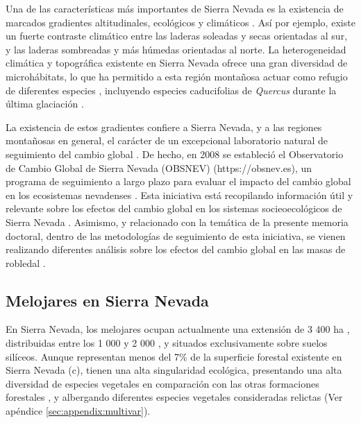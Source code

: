 Una de las características más importantes de Sierra Nevada es la existencia de marcados gradientes altitudinales, ecológicos y climáticos \autocite{Zamoraetal2021UniendoMacro}. Así por ejemplo, existe un fuerte contraste climático entre las laderas soleadas y secas orientadas al sur, y las laderas sombreadas y más húmedas orientadas al norte. La heterogeneidad climática y topográfica existente en Sierra Nevada ofrece una gran diversidad de microhábitats, lo que ha permitido a esta región montañosa actuar como refugio de diferentes especies \autocites{MedailDiadema2009GlacialRefugia,GomezLunt2007RefugiaRefugia,BlancoPastoretal2019TopographyExplains}, incluyendo especies caducifolias de \emph{Quercus} durante la última glaciación \autocites{Olaldeetal2002WhiteOaks,RodriguezSanchezetal2010TreeRange,Petitetal2002IdentificationRefugia}. 

La existencia de estos gradientes confiere a Sierra Nevada, y a las regiones montañosas en general, el carácter de un excepcional laboratorio natural de seguimiento del cambio global \autocite{Zamora2010AreasProtegidas,Zamoraetal2017MonitoringGlobal}. De hecho, en 2008 se estableció el Observatorio de Cambio Global de Sierra Nevada (OBSNEV) (https://obsnev.es), un programa de seguimiento a largo plazo para evaluar el impacto del cambio global en los ecosistemas nevadenses \autocites{Aspizuaetal2010ObservatorioCambio,BonetGarciaetal2011SierraNevada}. Esta iniciativa está recopilando información útil y relevante sobre los efectos del cambio global en los sistemas socieoecológicos de Sierra Nevada \autocites{Zamoraetal2015HuellaCambio,Zamoraetal2017GlobalChange,PerezLuqueetal2016SenalesCambio, RamosLosadaetal2017TenYears}. Asimismo, y relacionado con la temática de la presente memoria doctoral, dentro de las metodologías de seguimiento de esta iniciativa, se vienen realizando diferentes análisis sobre los efectos del cambio global en las masas de robledal \autocites[ver por ejemplo][]{BonetGarciaetal2015ImpactosCambio,Aspizuaetal2012EvaluacionGestion,Munoz2012BosquesAutoctonos}. 

\subsection{Melojares en Sierra Nevada}
\label{sec:metodologia:qpsn}

En Sierra Nevada, los melojares ocupan actualmente una extensión de 3 400 ha \autocite{PerezLuqueetal2019MapEcosystems}, distribuidas entre los 1 000 y 2 000 \elev, y situados exclusivamente sobre suelos silíceos. 
Aunque representan menos del 7\% de la superficie forestal existente en Sierra
Nevada (c), tienen una alta singularidad ecológica, presentando una alta diversidad de especies vegetales en comparación con las otras formaciones forestales \autocite{GomezAparicioetal2009ArePine,PerezLuqueetal2014SinfonevadaDataset},  y albergando diferentes especies vegetales consideradas relictas \autocite{Loriteetal2008PhytosociologicalReview, Blancaetal1998ThreatenedVascular} (Ver apéndice \ref{sec:appendix:multivar}). 

